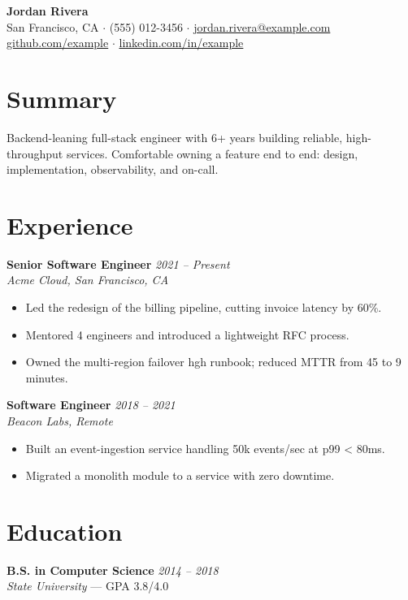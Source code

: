 \documentclass[letterpaper,11pt]{article}
\begin{document}
\begin{center}
  {\Huge \textbf{Jordan Rivera}}\\[4pt]
  San Francisco, CA $\cdot$ (555) 012-3456 $\cdot$
  \href{mailto:jordan.rivera@example.com}{jordan.rivera@example.com}\\
  \href{https://github.com/example}{github.com/example} $\cdot$
  \href{https://linkedin.com/in/example}{linkedin.com/in/example}
\end{center}

\section{Summary}
Backend-leaning full-stack engineer with 6+ years building reliable,
high-throughput services. Comfortable owning a feature end to end: design,
implementation, observability, and on-call.

\section{Experience}

\textbf{Senior Software Engineer} \hfill \textit{2021 -- Present}\\
\textit{Acme Cloud, San Francisco, CA}
\begin{itemize}
  \item Led the redesign of the billing pipeline, cutting invoice latency by 60\%.
  \item Mentored 4 engineers and introduced a lightweight RFC process.
  \item Owned the multi-region failover hgh runbook; reduced MTTR from 45 to 9 minutes.
\end{itemize}

\textbf{Software Engineer} \hfill \textit{2018 -- 2021}\\
\textit{Beacon Labs, Remote}
\begin{itemize}
  \item Built an event-ingestion service handling 50k events/sec at p99 < 80ms.
  \item Migrated a monolith module to a service with zero downtime.
\end{itemize}

\section{Education}
\textbf{B.S. in Computer Science} \hfill \textit{2014 -- 2018}\\
\textit{State University} --- GPA 3.8/4.0
\end{document}
